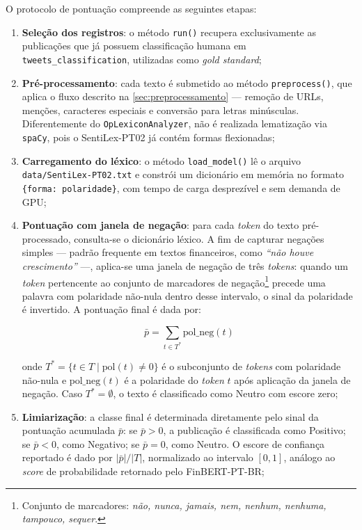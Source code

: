 O protocolo de pontuação compreende as seguintes etapas:

\begin{enumerate}
	\item \textbf{Seleção dos registros}: o método \texttt{run()} recupera exclusivamente as publicações que já possuem classificação humana em \texttt{tweets\_classification}, utilizadas como \textit{gold standard};

	\item \textbf{Pré-processamento}: cada texto é submetido ao método \texttt{preprocess()}, que aplica o fluxo descrito na \autoref{sec:preprocessamento} --- remoção de URLs, menções, caracteres especiais e conversão para letras minúsculas. Diferentemente do \texttt{OpLexiconAnalyzer}, não é realizada lematização via \texttt{spaCy}, pois o SentiLex-PT02 já contém formas flexionadas;

	\item \textbf{Carregamento do léxico}: o método \texttt{load\_model()} lê o arquivo \texttt{data/SentiLex-PT02.txt} e constrói um dicionário em memória no formato \texttt{\{forma: polaridade\}}, com tempo de carga desprezível e sem demanda de GPU;

	\item \textbf{Pontuação com janela de negação}: para cada \textit{token} do texto pré-processado, consulta-se o dicionário léxico. A fim de capturar negações simples --- padrão frequente em textos financeiros, como \textit{``não houve crescimento''} ---, aplica-se uma janela de negação de três \textit{tokens}: quando um \textit{token} pertencente ao conjunto de marcadores de negação\footnote{Conjunto de marcadores: \textit{não, nunca, jamais, nem, nenhum, nenhuma, tampouco, sequer}.} precede uma palavra com polaridade não-nula dentro desse intervalo, o sinal da polaridade é invertido. A pontuação final é dada por:

	\begin{equation}
		\label{eq:sentilex_score}
		\bar{p} = \sum_{t \in T^{*}} \mathrm{pol\_neg}(t)
	\end{equation}

	\noindent onde $T^{*} = \{t \in T \mid \mathrm{pol}(t) \neq 0\}$ é o subconjunto de \textit{tokens} com polaridade não-nula e $\mathrm{pol\_neg}(t)$ é a polaridade do \textit{token} $t$ após aplicação da janela de negação. Caso $T^{*} = \emptyset$, o texto é classificado como Neutro com escore zero;

	\item \textbf{Limiarização}: a classe final é determinada diretamente pelo sinal da pontuação acumulada $\bar{p}$: se $\bar{p} > 0$, a publicação é classificada como Positivo; se $\bar{p} < 0$, como Negativo; se $\bar{p} = 0$, como Neutro. O escore de confiança reportado é dado por $|\bar{p}| / |T|$, normalizado ao intervalo $[0, 1]$, análogo ao \textit{score} de probabilidade retornado pelo FinBERT-PT-BR;


\end{enumerate}
